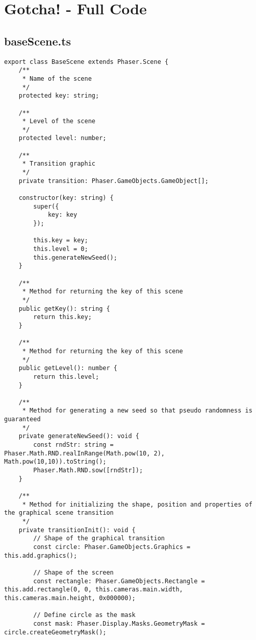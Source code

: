 

\chapter{Gotcha! - Full Code}\label{ch:gotcha!---full-code}
\section{baseScene.ts}\label{sec:basescene.ts}
\begin{lstlisting}[style=TypeScript, caption={baseScene.ts}]
export class BaseScene extends Phaser.Scene {
    /**
     * Name of the scene
     */
    protected key: string;

    /**
     * Level of the scene
     */
    protected level: number;

    /**
     * Transition graphic
     */
    private transition: Phaser.GameObjects.GameObject[];

    constructor(key: string) {
        super({
            key: key
        });

        this.key = key;
        this.level = 0;
        this.generateNewSeed();
    }

    /**
     * Method for returning the key of this scene
     */
    public getKey(): string {
        return this.key;
    }

    /**
     * Method for returning the key of this scene
     */
    public getLevel(): number {
        return this.level;
    }

    /**
     * Method for generating a new seed so that pseudo randomness is guaranteed
     */
    private generateNewSeed(): void {
        const rndStr: string = Phaser.Math.RND.realInRange(Math.pow(10, 2), Math.pow(10,10)).toString();
        Phaser.Math.RND.sow([rndStr]);
    }

    /**
     * Method for initializing the shape, position and properties of the graphical scene transition
     */
    private transitionInit(): void {
        // Shape of the graphical transition
        const circle: Phaser.GameObjects.Graphics = this.add.graphics();

        // Shape of the screen
        const rectangle: Phaser.GameObjects.Rectangle = this.add.rectangle(0, 0, this.cameras.main.width, this.cameras.main.height, 0x000000);

        // Define circle as the mask
        const mask: Phaser.Display.Masks.GeometryMask = circle.createGeometryMask();


\end{lstlisting}
